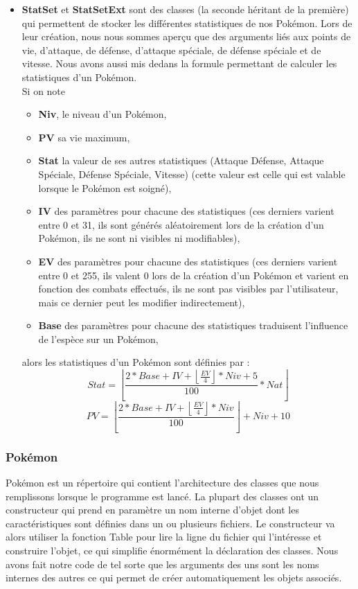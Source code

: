 \documentclass[a4paper,twoside, openany,11pt]{book}
\newcommand{\Floor}[1]{\left\lfloor #1 \right\rfloor}
\begin{document}
\begin{itemize}
\item  \textbf{StatSet} et \textbf{StatSetExt} sont des classes (la seconde héritant de la première) qui permettent de stocker les différentes statistiques de nos Pokémon. Lors de leur création, nous nous sommes aperçu que des arguments liés aux points de vie, d'attaque, de défense, d'attaque spéciale, de défense spéciale et de vitesse. Nous avons aussi mis dedans la formule permettant de calculer les statistiques d'un Pokémon. \\
Si on note
\begin{itemize}
\item \textbf{Niv}, le niveau d'un Pokémon, \\
\item \textbf{PV} sa vie maximum, \\
\item \textbf{Stat} la valeur de ses autres statistiques (Attaque Défense, Attaque Spéciale, Défense Spéciale, Vitesse) (cette valeur est celle qui est valable lorsque le Pokémon est soigné), \\
\item \textbf{IV} des paramètres pour chacune des statistiques (ces derniers varient entre 0 et 31, ils sont générés aléatoirement lors de la création d'un Pokémon, ils ne sont ni visibles ni modifiables),\\
\item \textbf{EV} des paramètres pour chacune des statistiques (ces derniers varient entre 0 et 255, ils valent 0 lors de la création d'un Pokémon et varient en fonction des combats effectués, ils ne sont pas visibles par l'utilisateur, mais ce dernier peut les modifier indirectement),\\
\item \textbf{Base} des paramètres pour chacune des statistiques traduisent l'influence de l'espèce sur un Pokémon,
\end{itemize}
alors les statistiques d'un Pokémon sont définies par :
\[
Stat = \Floor{\dfrac{2 * Base + IV + \Floor{\frac{EV}{4}} * Niv + 5}{100} * Nat}
\]
\[
PV =\Floor{\dfrac{2 * Base + IV + \Floor{\frac{EV}{4}} * Niv}{100}} + Niv + 10
\]
\end{itemize}

\subsubsection{Pokémon}
Pokémon est un répertoire qui contient l'architecture des classes que nous remplissons lorsque le programme est lancé. La plupart des classes ont un constructeur qui prend en paramètre un nom interne d'objet dont les caractéristiques sont définies dans un ou plusieurs fichiers. Le constructeur va alors utiliser la fonction Table pour lire la ligne du fichier qui l’intéresse et construire l'objet, ce qui simplifie énormément la déclaration des classes. Nous avons fait notre code de tel sorte que les arguments des uns sont les noms internes des autres ce qui permet de créer automatiquement les objets associés. 
\end{document}

